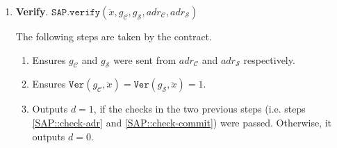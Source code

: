 \begin{enumerate}
 \item\textbf{Verify}. $\mathtt{SAP.verify}(\ddot{x}, g_{\scriptscriptstyle\mathcal C},g_{\scriptscriptstyle\mathcal S},adr_{\scriptscriptstyle\mathcal{C}}, adr_{\scriptscriptstyle\mathcal{S}})$
 
 
 The following steps are taken   by  the contract.
   \begin{enumerate}
   
\item\label{SAP::check-adr} Ensures $g_{\scriptscriptstyle\mathcal C}$ and $g_{\scriptscriptstyle\mathcal S}$ were sent from   $adr_{\scriptscriptstyle \mathcal{C}}$ and  $adr_{\scriptscriptstyle \mathcal{S}}$  respectively. 
  
   \item\label{SAP::check-commit} Ensures $\mathtt{Ver}(g_{\scriptscriptstyle\mathcal C},\ddot{x})=\mathtt{Ver}(g_{\scriptscriptstyle\mathcal S},\ddot{x}) =1$.
   
   \item Outputs $d=1$, if the checks in the two previous steps (i.e. steps \ref{SAP::check-adr} and \ref{SAP::check-commit}) were passed. Otherwise, it outputs $d=0$.
    \end{enumerate}
 \end{enumerate}

  
  
  
  
%



